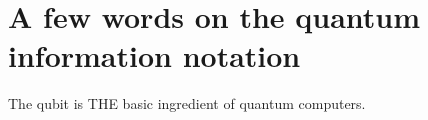 \section{A few words on the quantum information notation}

The qubit is THE basic ingredient of quantum computers. 